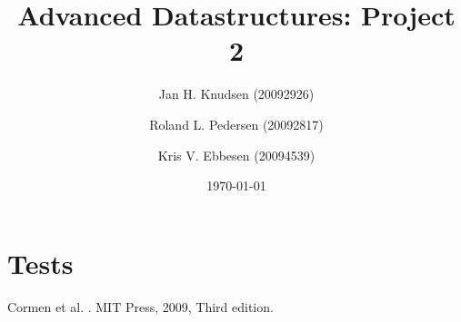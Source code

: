 \documentclass[a4paper, 12pt]{article}
\title{Advanced Datastructures: Project 2}
\date{\today}
\author{Jan H. Knudsen (20092926)
\and
Roland L. Pedersen (20092817)
\and
Kris V. Ebbesen (20094539)
}
\begin{document}
\maketitle
\newpage
\tableofcontents
\newpage





\section{Tests}


\begin{thebibliography}{9}

Cormen et al.
.
\newblock MIT Press, 2009, Third edition.

\end{thebibliography}
\end{document}
